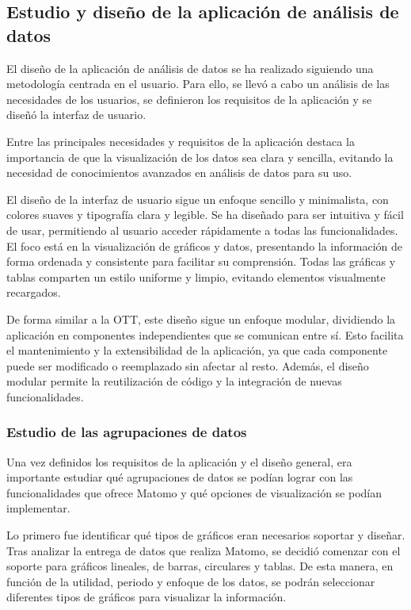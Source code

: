 \subsection{Estudio y diseño de la aplicación de análisis de datos}
\label{sec:diseno-estudio}

El diseño de la aplicación de análisis de datos se ha realizado siguiendo una metodología centrada en el usuario. Para ello, 
se llevó a cabo un análisis de las necesidades de los usuarios, se definieron los requisitos de la aplicación y se diseñó la 
interfaz de usuario.

Entre las principales necesidades y requisitos de la aplicación destaca la importancia de que la visualización de los datos sea 
clara y sencilla, evitando la necesidad de conocimientos avanzados en análisis de datos para su uso.

El diseño de la interfaz de usuario sigue un enfoque sencillo y minimalista, con colores suaves y tipografía clara y legible. 
Se ha diseñado para ser intuitiva y fácil de usar, permitiendo al usuario acceder rápidamente a todas las funcionalidades. 
El foco está en la visualización de gráficos y datos, presentando la información de forma ordenada y consistente para facilitar 
su comprensión. Todas las gráficas y tablas comparten un estilo uniforme y limpio, evitando elementos visualmente recargados.

De forma similar a la OTT, este diseño sigue un enfoque modular, dividiendo la aplicación en componentes independientes que se 
comunican entre sí. Esto facilita el mantenimiento y la extensibilidad de la aplicación, ya que cada componente puede ser modificado 
o reemplazado sin afectar al resto. Además, el diseño modular permite la reutilización de código y la integración de nuevas funcionalidades.

\subsubsection{Estudio de las agrupaciones de datos}
\label{sec:diseno-agrupaciones}
Una vez definidos los requisitos de la aplicación y el diseño general, era importante estudiar qué agrupaciones de datos se podían 
lograr con las funcionalidades que ofrece Matomo y qué opciones de visualización se podían implementar.

Lo primero fue identificar qué tipos de gráficos eran necesarios soportar y diseñar. Tras analizar la entrega de datos que realiza 
Matomo, se decidió comenzar con el soporte para gráficos lineales, de barras, circulares y tablas. De esta manera, en función de la 
utilidad, periodo y enfoque de los datos, se podrán seleccionar diferentes tipos de gráficos para visualizar la información.

